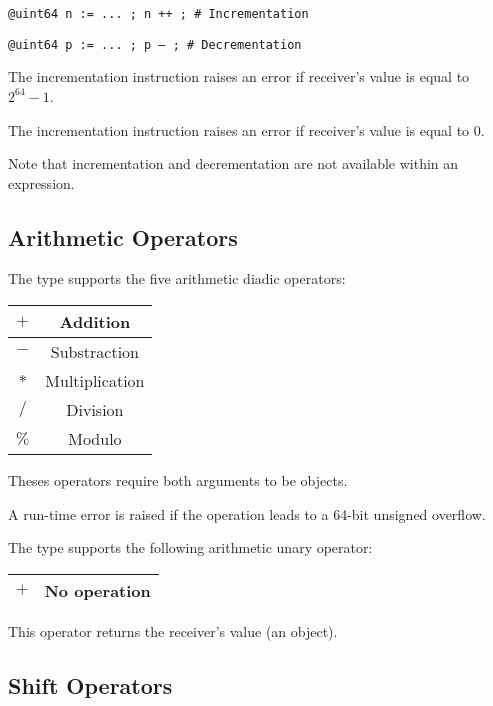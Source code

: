 \texttt{@uint64 n := ... ; n ++ ; \# Incrementation}

\texttt{@uint64 p := ... ; p -- ; \# Decrementation}\newline

The incrementation instruction raises an error if receiver's value is equal to $2^{64}-1$.\newline

The incrementation instruction raises an error if receiver's value is equal to 0.\newline

Note that incrementation and decrementation are not available within an expression.




\subsection{Arithmetic Operators}

The  type supports the five arithmetic diadic operators:\newline

\begin{tabular}{|c|c|}
\hline
$+$ & Addition \\
\hline
$-$ & Substraction \\
\hline
$*$ & Multiplication \\
\hline
$/$ & Division \\
\hline
$\%$ & Modulo \\
\hline
\end{tabular}\newline

Theses operators require both arguments to be  objects.\newline

A run-time error is raised if the operation leads to a 64-bit unsigned overflow.

The  type supports the following arithmetic unary operator:\newline

\begin{tabular}{|c|c|}
\hline
$+$ & No operation \\
\hline
\end{tabular}\newline

This operator returns the receiver's value (an   object).




\subsection{Shift Operators}


